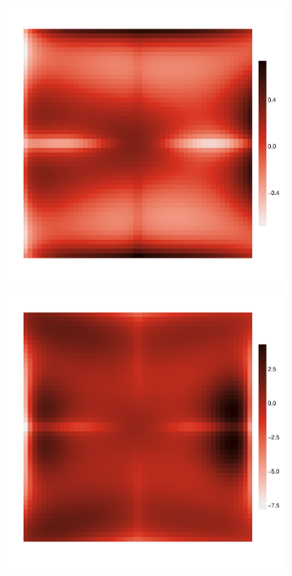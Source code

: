 \documentclass{article}
\begin{document}
\begin{figure}
\begin{subfigure}{0.3\textwidth}
		\includegraphics[width=\linewidth]{figures/res113}\\
		\includegraphics[width=\linewidth]{figures/res114}\\

\end{subfigure}
\end{figure}
\end{document}
